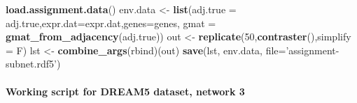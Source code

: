\documentclass[]{article}
\newenvironment{Shaded}{\begin{snugshade}}{\end{snugshade}}
\newcommand{\KeywordTok}[1]{\textcolor[rgb]{0.13,0.29,0.53}{\textbf{#1}}}
\newcommand{\DataTypeTok}[1]{\textcolor[rgb]{0.13,0.29,0.53}{#1}}
\newcommand{\DecValTok}[1]{\textcolor[rgb]{0.00,0.00,0.81}{#1}}
\newcommand{\StringTok}[1]{\textcolor[rgb]{0.31,0.60,0.02}{#1}}
\newcommand{\NormalTok}[1]{#1}
\let\oldparagraph\paragraph
\renewcommand{\paragraph}[1]{\oldparagraph{#1}\mbox{}}
\theoremstyle{definition}
\theoremstyle{definition}
\theoremstyle{definition}
\theoremstyle{remark}
\begin{document}
\begin{Shaded}
\begin{Highlighting}[]
\KeywordTok{load.assignment.data}\NormalTok{()}
\NormalTok{env.data <-}\StringTok{ }\KeywordTok{list}\NormalTok{(}\DataTypeTok{adj.true =}\NormalTok{ adj.true,}\DataTypeTok{expr.dat=}\NormalTok{expr.dat,}\DataTypeTok{genes=}\NormalTok{genes,}
                 \DataTypeTok{gmat =} \KeywordTok{gmat_from_adjacency}\NormalTok{(adj.true))}
\NormalTok{out <-}\StringTok{ }\KeywordTok{replicate}\NormalTok{(}\DecValTok{50}\NormalTok{,}\KeywordTok{contraster}\NormalTok{(),}\DataTypeTok{simplify =}\NormalTok{ F)}
\NormalTok{lst <-}\StringTok{ }\KeywordTok{combine_args}\NormalTok{(rbind)(out)}
\KeywordTok{save}\NormalTok{(lst, env.data, }\DataTypeTok{file=}\StringTok{'assignment-subnet.rdf5'}\NormalTok{)}
\end{Highlighting}
\end{Shaded}

\paragraph{Working script for DREAM5 dataset, network
3}\label{working-script-for-dream5-dataset-network-3}
\end{document}
